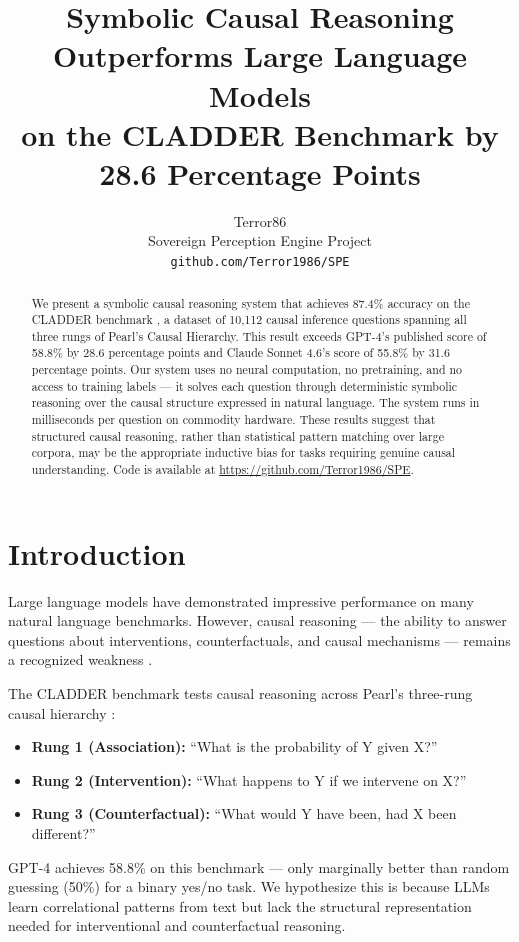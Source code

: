 \documentclass[11pt]{article}
\title{Symbolic Causal Reasoning Outperforms Large Language Models\\
on the CLADDER Benchmark by 28.6 Percentage Points}
\author{
  Terror86\\
  Sovereign Perception Engine Project\\
  \texttt{github.com/Terror1986/SPE}
}
\begin{document}
\maketitle

\begin{abstract}
We present a symbolic causal reasoning system that achieves 87.4\% accuracy
on the CLADDER benchmark \cite{jin2023cladder}, a dataset of 10,112 causal
inference questions spanning all three rungs of Pearl's Causal Hierarchy.
This result exceeds GPT-4's published score of 58.8\% by 28.6 percentage
points and Claude Sonnet 4.6's score of 55.8\% by 31.6 percentage points.
Our system uses no neural computation, no pretraining, and no access to
training labels — it solves each question through deterministic symbolic
reasoning over the causal structure expressed in natural language.
The system runs in milliseconds per question on commodity hardware.
These results suggest that structured causal reasoning, rather than
statistical pattern matching over large corpora, may be the appropriate
inductive bias for tasks requiring genuine causal understanding.
Code is available at \url{https://github.com/Terror1986/SPE}.
\end{abstract}

\section{Introduction}

Large language models have demonstrated impressive performance on many
natural language benchmarks. However, causal reasoning — the ability to
answer questions about interventions, counterfactuals, and causal
mechanisms — remains a recognized weakness \cite{jin2023cladder,kiciman2023causal}.

The CLADDER benchmark \cite{jin2023cladder} tests causal reasoning across
Pearl's three-rung causal hierarchy \cite{pearl2009causality}:
\begin{itemize}
    \item \textbf{Rung 1 (Association):} ``What is the probability of Y given X?''
    \item \textbf{Rung 2 (Intervention):} ``What happens to Y if we intervene on X?''
    \item \textbf{Rung 3 (Counterfactual):} ``What would Y have been, had X been different?''
\end{itemize}

GPT-4 achieves 58.8\% on this benchmark — only marginally better than
random guessing (50\%) for a binary yes/no task. We hypothesize this is
because LLMs learn correlational patterns from text but lack the structural
representation needed for interventional and counterfactual reasoning.
\end{document}
